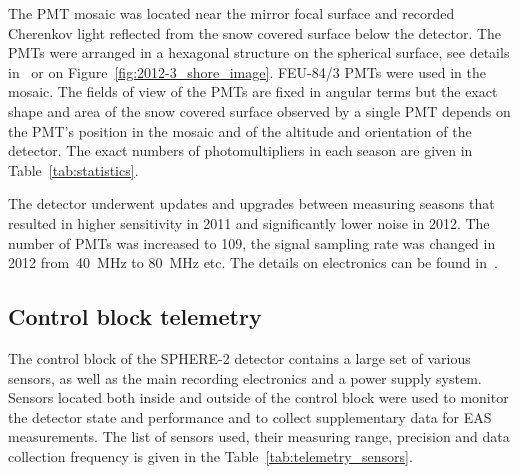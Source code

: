 \documentclass[universe,article,submit,moreauthors,pdftex]{Definitions/mdpi}
\begin{document}
The PMT mosaic was located near the mirror focal surface and recorded Cherenkov light reflected from the snow covered surface below the detector. The PMTs were arranged in a hexagonal structure on the spherical surface, see details in~\cite{Ant20} or on Figure~\ref{fig:2012-3_shore_image}. FEU-84/3 PMTs were used in the mosaic. The fields of view of the PMTs are fixed in angular terms but the exact shape and area of the snow covered surface observed by a single PMT depends on the PMT's position in the mosaic and of the altitude and orientation of the detector. The exact numbers of photomultipliers in each season are given in Table~\ref{tab:statistics}. 

The detector underwent updates and upgrades between measuring seasons that resulted in higher sensitivity in 2011 and significantly lower noise in 2012. The number of PMTs was increased to 109, the signal sampling rate was changed in 2012 from~40~MHz to 80~MHz etc. The details on electronics can be found in~\cite{Ant20}.


\subsection{Control block telemetry}

The control block of the SPHERE-2 detector contains a large set of various sensors, as well as the main recording electronics and a power supply system. Sensors located both inside and outside of the control block were used to monitor the detector state and performance and to collect supplementary data for EAS measurements. The list of sensors used, their measuring range, precision and data collection frequency is given in the Table~\ref{tab:telemetry_sensors}. 
\end{document}
